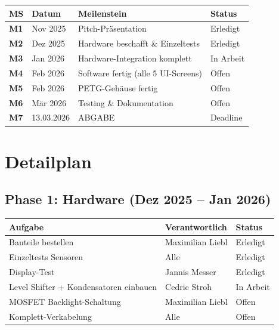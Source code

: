 \documentclass[a4paper,11pt]{article}
\begin{document}
\begin{longtable}{p{1cm} p{2.5cm} p{5.5cm} p{3.5cm}}
\toprule
\rowcolor{tableheader}
\textbf{MS} & \textbf{Datum} & \textbf{Meilenstein} & \textbf{Status} \\
\midrule
\endhead
\textbf{M1} & Nov 2025    & Pitch-Präsentation                            & \textcolor{statusdone}{Erledigt} \\
\textbf{M2} & Dez 2025    & Hardware beschafft \& Einzeltests              & \textcolor{statusdone}{Erledigt} \\
\textbf{M3} & Jan 2026    & Hardware-Integration komplett                  & \textcolor{statuswip}{In Arbeit} \\
\textbf{M4} & Feb 2026    & Software fertig (alle 5 UI-Screens)            & \textcolor{statusopen}{Offen} \\
\textbf{M5} & Feb 2026    & PETG-Gehäuse fertig                            & \textcolor{statusopen}{Offen} \\
\textbf{M6} & Mär 2026    & Testing \& Dokumentation                       & \textcolor{statusopen}{Offen} \\
\textbf{M7} & 13.03.2026  & ABGABE                                         & \textcolor{statusopen}{Deadline} \\
\bottomrule
\end{longtable}

\section{Detailplan}

\subsection{Phase 1: Hardware (Dez 2025 -- Jan 2026)}

\begin{longtable}{p{6.5cm} p{3.5cm} p{2.5cm}}
\toprule
\rowcolor{tableheader}
\textbf{Aufgabe} & \textbf{Verantwortlich} & \textbf{Status} \\
\midrule
\endhead
Bauteile bestellen                          & Maximilian Liebl   & \textcolor{statusdone}{Erledigt} \\
Einzeltests Sensoren                        & Alle                & \textcolor{statusdone}{Erledigt} \\
Display-Test                                & Jannis Messer       & \textcolor{statusdone}{Erledigt} \\
Level Shifter + Kondensatoren einbauen      & Cedric Stroh        & \textcolor{statuswip}{In Arbeit} \\
MOSFET Backlight-Schaltung                  & Maximilian Liebl    & \textcolor{statusopen}{Offen} \\
Komplett-Verkabelung                        & Alle                & \textcolor{statusopen}{Offen} \\
\bottomrule
\end{longtable}
\end{document}
